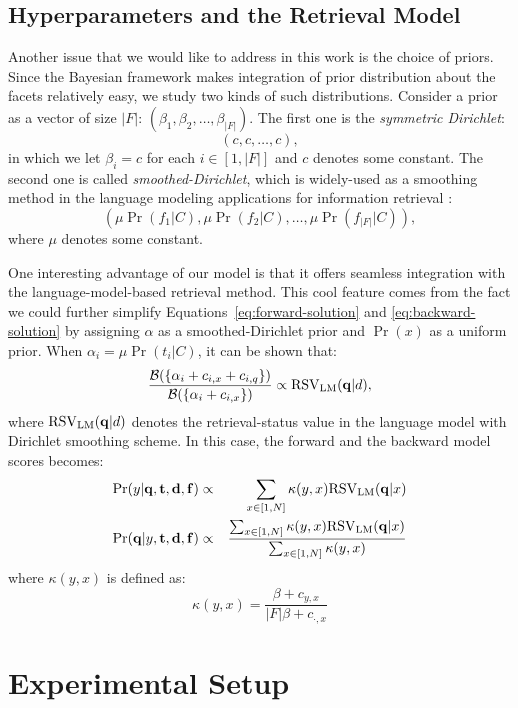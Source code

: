 \subsection{Hyperparameters and the Retrieval Model} \label{ss:integration}

Another issue that we would like to address in this work is the choice of
priors.  Since the Bayesian framework makes integration of prior distribution
about the facets relatively easy, we study two kinds of such distributions.
Consider a prior as a vector of size $|F|$: $(\beta_1, \beta_2, \ldots,
\beta_{|F|})$.  The first one is the \emph{symmetric Dirichlet}: \[ (c, c,
\ldots, c), \] in which we let $\beta_i = c$ for each $i \in [1, |F|]$ and $c$
denotes some constant.  The second one is called \emph{smoothed-Dirichlet},
which is widely-used as a smoothing method in the language modeling
applications for information retrieval \cite{zhai2004study}: \[ (\mu
\Pr(f_1|C), \mu \Pr(f_2|C), \ldots, \mu \Pr(f_{|F|}|C)), \] where $\mu$ denotes
some constant.

One interesting advantage of our model is that it offers seamless integration
with the language-model-based retrieval method.  This cool feature comes from
the fact we could further simplify Equations~\eqref{eq:forward-solution} and
\eqref{eq:backward-solution} by assigning $\alpha$ as a smoothed-Dirichlet
prior and $\Pr(x)$ as a uniform prior.  When $\alpha_i = \mu \Pr(t_i|C)$, it
can be shown that: \[ \frac{\mathcal{B}(\{\alpha_i + c_{i,x} + c_{i,q}
\})}{\mathcal{B}(\{\alpha_i + c_{i,x} \})} \propto {\rm RSV}_{\rm
LM}(\mathbf{q}|d), \] where ${\rm RSV}_{\rm LM}(\mathbf{q}|d)$ denotes the
retrieval-status value in the language model with Dirichlet smoothing scheme.
In this case, the forward and the backward model scores becomes:
\begin{eqnarray*}
  \Pr(y|\mathbf{q}, \mathbf{t}, \mathbf{d}, \mathbf{f}) &\propto& 
  \sum_{x \in [1, N]} \kappa(y,x) {\rm RSV}_{\rm LM}(\mathbf{q}|x) \nonumber\\
  \Pr(\mathbf{q}|y, \mathbf{t}, \mathbf{d}, \mathbf{f}) &\propto&
  \frac{\sum_{x \in [1, N]} \kappa(y,x) {\rm RSV}_{\rm LM}(\mathbf{q}|x)} 
  {\sum_{x \in [1, N]} \kappa(y,x)} \nonumber
\end{eqnarray*} where $\kappa(y,x)$ is defined as:
\[ \kappa(y,x) = \frac{\beta + c_{y,x}}{|F|\beta + c_{\cdot,x}} \]

\section{Experimental Setup}\label{s:experimental-setup}

